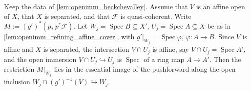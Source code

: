 \begin{lemma}\leanok
  \label{lem:openimm_bareBC_app_isIso_affine}
  Keep the data of \cref{lem:openimm_beckchevalley}. Assume that \(V\) is an affine
  open of \(X\), that \(X\) is separated, and that \(\mathcal F\) is quasi-coherent.
  Write \(M := (g')^*(p_*\,p^*\mathcal{F})\).  Let \(W_j = \operatorname{Spec} B \subseteq X'\),
  \(U_j = \operatorname{Spec} A \subseteq X\) be as in \cref{lem:openimm_refining_affine_cover},
  with \(g'|_{W_j} = \operatorname{Spec}\varphi\), \(\varphi : A \to B\). Since \(V\) is affine and
  \(X\) is separated, the intersection \(V \cap U_j\) is affine, say \(V \cap U_j =
  \operatorname{Spec} A'\), and the open immersion \(V \cap U_j \hookrightarrow U_j\) is
  \(\operatorname{Spec}\) of a ring map \(A \to A'\). Then the restriction \(M|_{W_j}\) lies in
  the essential image of the pushforward along the open inclusion
  \(W_j \cap (g')^{-1}(V) \hookrightarrow W_j\).
\end{lemma}
